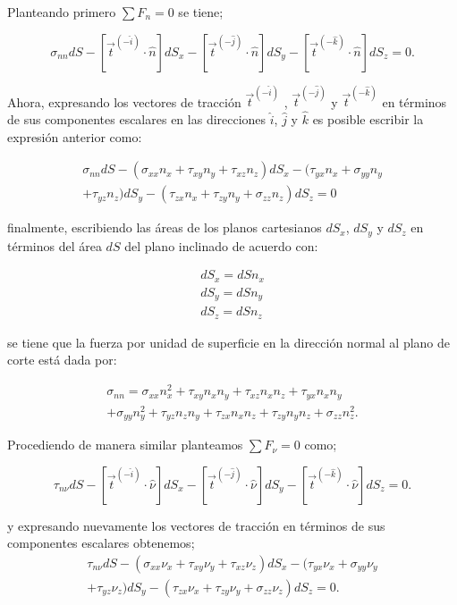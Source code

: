 \documentclass[../notas medios.tex]{subfiles}
\begin{document}
Planteando primero $\sum {{F_n} = 0}$ se tiene;

\[{\sigma _{nn}}dS - [{{\vec t}^{( - \hat i)}} \cdot \hat n]d{S_x} - [{{\vec t}^{( - \hat j)}} \cdot \hat n]d{S_y} - [{{\vec t}^{( - \hat k)}} \cdot \hat n]d{S_z} = 0.\]


Ahora, expresando los vectores de tracción ${{\vec t}^{( - \hat i)}}$ , ${{\vec
t}^{(-\hat j)}}$ y ${{\vec t}^{( - \hat k)}}$ en términos de sus componentes
escalares en las direcciones $\hat{i}$, $\hat{j}$ y $\hat{k}$ es posible escribir la expresión anterior como:

\begin{align*}
{\sigma _{nn}}dS - ({\sigma _{xx}}{n_x} + {\tau _{xy}}{n_y} + {\tau _{xz}}{n_z})d{S_x} - ({\tau _{yx}}{n_x} + {\sigma _{yy}}{n_y}\\
+ {\tau _{yz}}{n_z})d{S_y} - ({\tau _{zx}}{n_x} + {\tau _{zy}}{n_y} + {\sigma _{zz}}{n_z})d{S_z}=0
\end{align*}

finalmente, escribiendo las áreas de los planos cartesianos $dS_x$, $dS_y$ y $dS_z$ en términos del área $dS$ del plano inclinado de acuerdo con:

\begin{align*}
d{S_x} = dS{n_x}\\
d{S_y} = dS{n_y}\\
d{S_z} = dS{n_z}
\end{align*}

se tiene que la fuerza por unidad de superficie en la dirección normal al plano de corte está dada por:

\begin{equation}
\begin{aligned}
{\sigma _{nn}} = {\sigma _{xx}}n_x^2 + {\tau _{xy}}{n_x}{n_y} + {\tau _{xz}}{n_x}{n_z} + {\tau _{yx}}{n_x}{n_y}\\
 + {\sigma _{yy}}n_y^2 + {\tau _{yz}}{n_z}{n_y} + {\tau _{zx}}{n_x}{n_z} + {\tau _{zy}}{n_y}{n_z} + {\sigma _{zz}}n_z^2.
\end{aligned}
\label{sigmann}
\end{equation}

Procediendo de manera similar planteamos $\sum {{F_\nu} = 0}$ como;

\[{\tau _{n\nu}}dS - [{{\vec t}^{( - \hat i)}} \cdot \hat \nu]d{S_x} - [{{\vec t}^{( - \hat j)}} \cdot \hat \nu]d{S_y} - [{{\vec t}^{( - \hat k)}} \cdot \hat \nu]d{S_z} = 0.\]


y expresando nuevamente los vectores de tracción en términos de sus componentes escalares obtenemos;
\begin{align*}
{\tau _{n\nu}}dS - ({\sigma _{xx}}{\nu_x} + {\tau _{xy}}{\nu_y} + {\tau _{xz}}{\nu_z})d{S_x} - ({\tau _{yx}}{\nu_x} + {\sigma _{yy}}{\nu_y}\\
+ {\tau _{yz}}{\nu_z})d{S_y} - ({\tau _{zx}}{\nu_x} + {\tau _{zy}}{\nu_y} + {\sigma _{zz}}{\nu_z})d{S_z}=0.
\end{align*}
\end{document}
